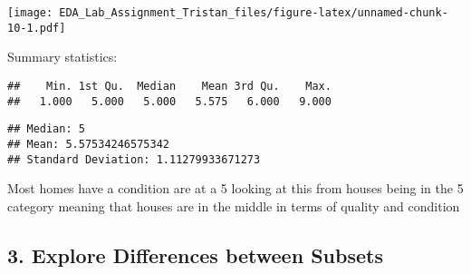 \documentclass[
]{article}
\newenvironment{Shaded}{\begin{snugshade}}{\end{snugshade}}
\newcommand{\AttributeTok}[1]{\textcolor[rgb]{0.13,0.29,0.53}{#1}}
\newcommand{\DecValTok}[1]{\textcolor[rgb]{0.00,0.00,0.81}{#1}}
\newcommand{\FloatTok}[1]{\textcolor[rgb]{0.00,0.00,0.81}{#1}}
\newcommand{\FunctionTok}[1]{\textcolor[rgb]{0.13,0.29,0.53}{\textbf{#1}}}
\newcommand{\NormalTok}[1]{#1}
\newcommand{\OtherTok}[1]{\textcolor[rgb]{0.56,0.35,0.01}{#1}}
\newcommand{\SpecialCharTok}[1]{\textcolor[rgb]{0.81,0.36,0.00}{\textbf{#1}}}
\newcommand{\StringTok}[1]{\textcolor[rgb]{0.31,0.60,0.02}{#1}}
\begin{document}
\begin{Shaded}
\end{Shaded}

\texttt{[image: EDA\_Lab\_Assignment\_Tristan\_files/figure-latex/unnamed-chunk-10-1.pdf]}

Summary statistics:

\begin{Shaded}
\end{Shaded}

\begin{verbatim}
##    Min. 1st Qu.  Median    Mean 3rd Qu.    Max. 
##   1.000   5.000   5.000   5.575   6.000   9.000
\end{verbatim}

\begin{verbatim}
## Median: 5
## Mean: 5.57534246575342
## Standard Deviation: 1.11279933671273
\end{verbatim}

Most homes have a condition are at a 5 looking at this from houses being
in the 5 category meaning that houses are in the middle in terms of
quality and condition

\hypertarget{explore-differences-between-subsets}{%
\subsection{3. Explore Differences between
Subsets}\label{explore-differences-between-subsets}}
\end{document}
